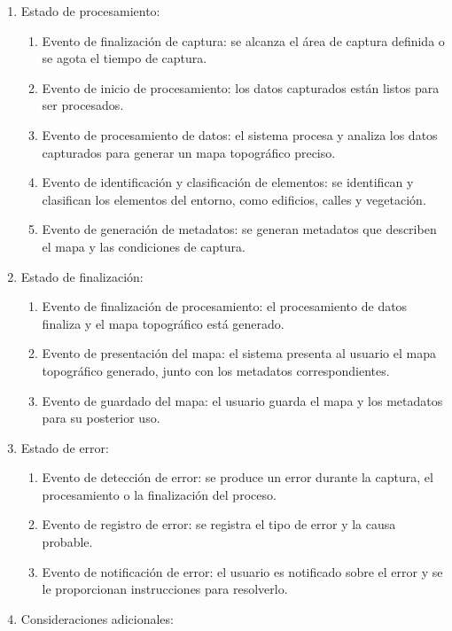\documentclass[12pt,a4paper, twoside]{article} %
\begin{document}
\begin{enumerate}
\item Estado de procesamiento:
\begin{enumerate}
    \item Evento de finalización de captura: se alcanza el área de captura definida o se agota el tiempo de captura.
    \item Evento de inicio de procesamiento: los datos capturados están listos para ser procesados.
    \item Evento de procesamiento de datos: el sistema procesa y analiza los datos capturados para generar un mapa topográfico preciso.
    \item Evento de identificación y clasificación de elementos: se identifican y clasifican los elementos del entorno, como edificios, calles y vegetación.
    \item Evento de generación de metadatos: se generan metadatos que describen el mapa y las condiciones de captura.
\end{enumerate}

\item Estado de finalización:
\begin{enumerate}
    \item Evento de finalización de procesamiento: el procesamiento de datos finaliza y el mapa topográfico está generado.
    \item Evento de presentación del mapa: el sistema presenta al usuario el mapa topográfico generado, junto con los metadatos correspondientes.
    \item Evento de guardado del mapa: el usuario guarda el mapa y los metadatos para su posterior uso.
\end{enumerate}

\item Estado de error:
\begin{enumerate}
    \item Evento de detección de error: se produce un error durante la captura, el procesamiento o la finalización del proceso.
    \item Evento de registro de error: se registra el tipo de error y la causa probable.
    \item Evento de notificación de error: el usuario es notificado sobre el error y se le proporcionan instrucciones para resolverlo.
\end{enumerate}

\item Consideraciones adicionales:


\end{enumerate}
\end{document}
